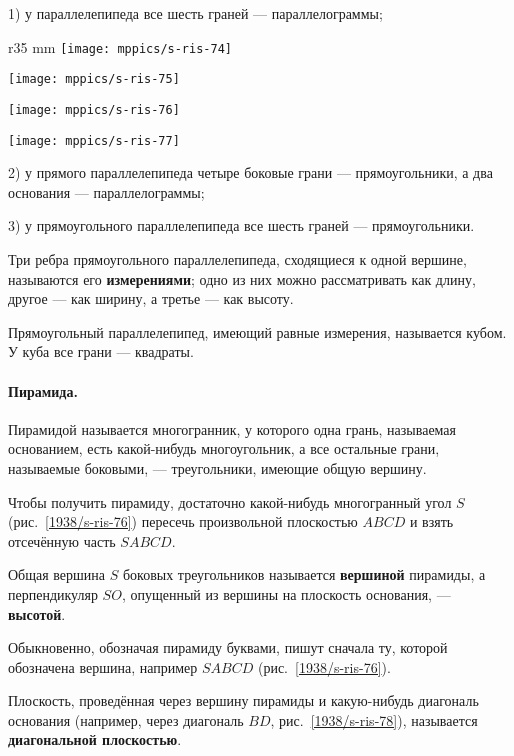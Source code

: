 1) у параллелепипеда все шесть граней — параллелограммы;

\begin{wrapfigure}[39]{r}{35 mm}
\vskip-0mm
\centering
\texttt{[image: mppics/s-ris-74]}
\caption{}\label{1938/s-ris-74}
\bigskip
\texttt{[image: mppics/s-ris-75]}
\caption{}\label{1938/s-ris-75}
\bigskip
\texttt{[image: mppics/s-ris-76]}
\caption{}\label{1938/s-ris-76}
\bigskip
\texttt{[image: mppics/s-ris-77]}
\caption{}\label{1938/s-ris-77}
\end{wrapfigure}

2) у прямого параллелепипеда четыре боковые грани — прямоугольники, а два основания — параллелограммы;

3) у прямоугольного параллелепипеда все шесть граней — прямоугольники.

Три ребра прямоугольного параллелепипеда, сходящиеся к одной вершине, называются его \textbf{измерениями};
одно из них можно рассматривать как длину, другое — как ширину, а третье — как высоту.

Прямоугольный параллелепипед, имеющий равные измерения, называется кубом.
У куба все грани — квадраты.

\paragraph{Пирамида.}\label{1938/s70}
Пирамидой называется многогранник, у которого одна грань, называемая основанием, есть какой-нибудь многоугольник, а все остальные грани, называемые боковыми, — треугольники, имеющие общую вершину.

Чтобы получить пирамиду, достаточно какой-нибудь многогранный угол $S$ (рис.~\ref{1938/s-ris-76}) пересечь произвольной плоскостью $ABCD$ и взять отсечённую часть $SABCD$.

Общая вершина $S$ боковых треугольников называется \textbf{вершиной} пирамиды, а перпендикуляр $SO$, опущенный из вершины на плоскость основания, — \textbf{высотой}.

Обыкновенно, обозначая пирамиду буквами, пишут сначала ту, которой обозначена вершина, например $SABCD$ (рис.~\ref{1938/s-ris-76}).



Плоскость, проведённая через вершину пирамиды и какую-нибудь диагональ основания (например, через диагональ $BD$, рис.~\ref{1938/s-ris-78}), называется \textbf{диагональной плоскостью}.

